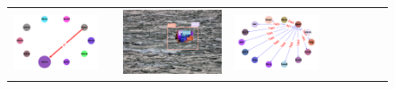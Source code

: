 \begin{figure}
\begin{tabular}{p{0.3cm}|rc|p{0.1cm}rc|p{0.1cm}rc}
		\includegraphics[width=\figwidthvis, align=c]{2334137_ours_zs_graph_gt.png} & & \includegraphics[width=\figwidthvis, align=c]{2334137_ours_zs_baseline.png} &
		\includegraphics[width=\figwidthvis, align=c]{2334137_ours_zs_graph_baseline.png} & 

\end{tabular}
\end{figure}
